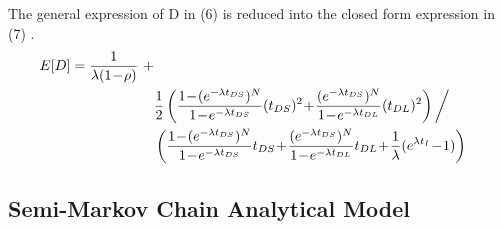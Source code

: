 \documentclass[8pt]{article}
\begin{document}
%
%
%

The general expression of D in (6) is reduced into the closed form expression in (7) \cite{6151867}. 
\begin{equation}
\begin{aligned}
E[D] = {\hbox{1}\over \lambda (\hbox{1} \!-\! \rho)}\ + \\
&   {\hbox{1}\over \hbox{2}} \left({\hbox{1} \!-\! (e^{-\lambda t_{DS}})^{N}\over \hbox{1} \!-\! e^{-\lambda t_{DS}}} (t_{DS})^{2} \!+\! {(e^{-\lambda t_{DS}})^{N}\over \hbox{1} \!-\! e^{-\lambda t_{DL}}} (t_{DL})^{2} \right) \bigg/ \cr&\left({\hbox{1} \!-\! (e^{-\lambda t_{DS}})^{N} \over \hbox{1} \!-\! e^{-\lambda t_{DS}}} t_{DS} \!+\! {(e^{-\lambda t_{DS}})^{N}\over \hbox{1} \!-\! e^{-\lambda t_{DL}}}t_{DL} \!+\! {\hbox{1}\over \lambda} (e^{\lambda t_{I}} \!-\! \hbox{1}) \right)
\end{aligned}
\end{equation}

\subsection*{Semi-Markov Chain Analytical Model}
\end{document}
